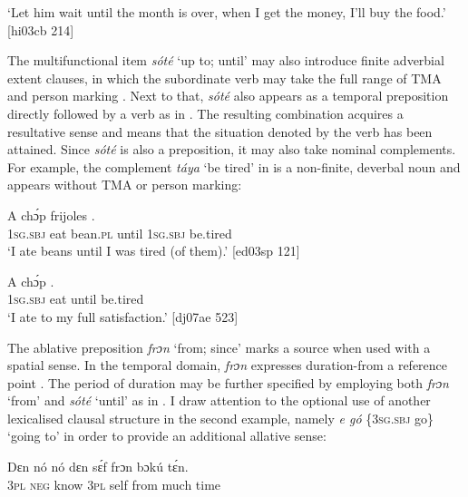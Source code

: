 \glt ‘Let him wait until the month is over, when I get the money, I’ll buy the food.’ [hi03cb 214]
\z

The multifunctional item \textit{sóté} ‘up to; until’ may also introduce finite adverbial extent clauses, in which the subordinate verb may take the full range of TMA and person marking . Next to that, \textit{sóté} also appears as a temporal preposition directly followed by a verb as in . The resulting combination acquires a resultative sense and means that the situation denoted by the verb has been attained. Since \textit{sóté} is also a preposition, it may also take nominal complements. For example, the complement \textit{táya} ‘be tired’ in  is a non-finite, deverbal noun and appears without TMA or person marking: 


\ea%
    \label{ex:key:1028}
    \gll A    chɔ́p  frijoles          .\\
\textsc{1sg.sbj}  eat    bean.\textsc{pl}  until  \textsc{1sg.sbj}  be.tired\\

\glt ‘I ate beans until I was tired (of them).’ [ed03sp 121]
\z


\ea%
    \label{ex:key:1029}
    \gll A    chɔ́p      .\\
\textsc{1sg.sbj}  eat    until  be.tired\\

\glt ‘I ate to my full satisfaction.’ [dj07ae 523]
\z

The ablative preposition \textit{frɔn} ‘from; since’ marks a source when used with a spatial sense. In the temporal domain, \textit{frɔn} expresses duration-from a reference point . The period of duration may be further specified by employing both \textit{frɔn} ‘from’ and \textit{sóté} ‘until’ as in . I draw attention to the optional use of another lexicalised clausal structure in the second example, namely\textit{ e gó} \{3\textsc{sg.sbj} go\textsc{\}} ‘going to’ in order to provide an additional allative sense:


\ea%
    \label{ex:key:1030}
    \gll Dɛn  nó  nó    dɛn  sɛ́f  frɔn    bɔkú  tɛ́n.\\
\textsc{3pl}  \textsc{neg}  know  \textsc{3pl}  self  from  much  time\\

